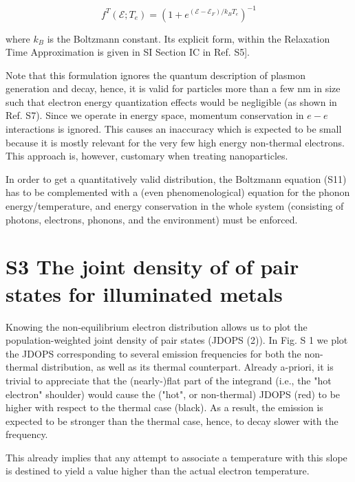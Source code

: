 \documentclass[10pt]{article}
\begin{document}
\begin{equation*}
f^{T}\left(\mathcal{E} ; T_{e}\right)=\left(1+e^{\left(\mathcal{E}-\mathcal{E}_{F}\right) / k_{B} T_{e}}\right)^{-1} \tag{S12}
\end{equation*}


where $k_{B}$ is the Boltzmann constant. Its explicit form, within the Relaxation Time Approximation is given in SI Section IC in Ref. S5].

Note that this formulation ignores the quantum description of plasmon generation and decay, hence, it is valid for particles more than a few nm in size such that electron energy quantization effects would be negligible (as shown in Ref. S7). Since we operate in energy space, momentum conservation in $e-e$ interactions is ignored. This causes an inaccuracy which is expected to be small because it is mostly relevant for the very few high energy non-thermal electrons. This approach is, however, customary when treating nanoparticles.

In order to get a quantitatively valid distribution, the Boltzmann equation (S11) has to be complemented with a (even phenomenological) equation for the phonon energy/temperature, and energy conservation in the whole system (consisting of photons, electrons, phonons, and the environment) must be enforced.

\section*{S3 The joint density of of pair states for illuminated metals}
Knowing the non-equilibrium electron distribution allows us to plot the population-weighted joint density of pair states (JDOPS (2)). In Fig. S 1 we plot the JDOPS corresponding to several emission frequencies for both the non-thermal distribution, as well as its thermal counterpart. Already a-priori, it is trivial to appreciate that the (nearly-)flat part of the integrand (i.e., the "hot electron" shoulder) would cause the ("hot", or non-thermal) JDOPS (red) to be higher with respect to the thermal case (black). As a result, the emission is expected to be stronger than the thermal case, hence, to decay slower with the frequency.

This already implies that any attempt to associate a temperature with this slope is destined to yield a value higher than the actual electron temperature.
\end{document}
